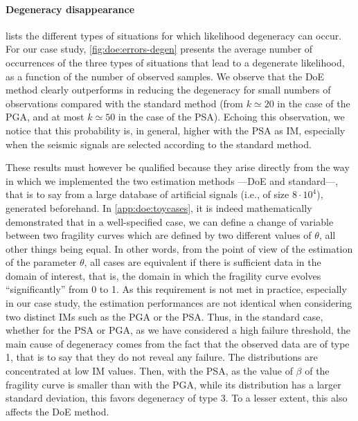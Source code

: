 \paragraph{Degeneracy disappearance} 

{ lists the different types of situations for which likelihood degeneracy can occur. For our case study,  \cref{fig:doe:errors-degen} presents the average number of occurrences of the three types of situations that lead to a degenerate likelihood, as a function of the number of observed samples. We observe that the DoE method clearly outperforms in reducing the degeneracy for small numbers of observations compared with the standard method (from $k\simeq 20$ in the case of the PGA, and at most $k\simeq 50$ in the case of the PSA). Echoing this observation, we notice that this probability is, in general, higher with the PSA as IM, especially when the seismic signals are selected according to the standard method.

These results must however be qualified because they arise directly from the way in which we implemented the two estimation methods ---DoE and standard---, that is to say from a large database of artificial signals (i.e., of size $8\cdot10^4$), generated {beforehand}. In \cref{app:doe:toycases}, it is indeed  mathematically demonstrated that in a well-specified case, we can define a change of variable between two fragility curves which are defined by two different values of $\theta$, all other things being equal. In other words, from the point of view of the estimation of the parameter $\theta$, all cases are equivalent if there is sufficient data in the domain of interest, that is, the domain in which the fragility curve evolves ``significantly'' from 0 to 1. As this requirement is not met in practice, especially in our case study, the estimation performances are not identical when considering two distinct IMs such as the PGA or the PSA. Thus, in the standard case, whether for the PSA or PGA, as we have considered a high failure threshold, the main cause of degeneracy comes from the fact that the observed data are of type 1, that is to say that they do not reveal any failure. The distributions are concentrated at low IM values. Then, with the PSA, as the value of $\beta$ of the fragility curve is smaller than with the PGA, while its distribution has a larger standard deviation, this favors degeneracy of type 3. To a lesser extent, this also affects the DoE method.}


